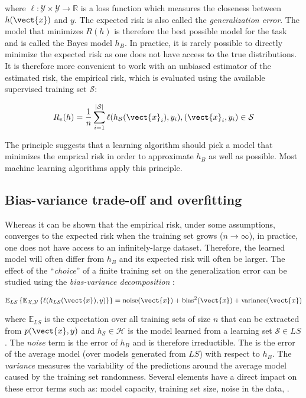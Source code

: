 where $\ell: \mathcal{Y}\times\mathcal{Y} \rightarrow \mathbb{R}$ is a loss function
which measures the closeness between $h(\vect{x})$ and $y$. The expected risk is
also called the \textit{generalization error}. The model that minimizes $R(h)$ is
therefore the best possible model for the task and is called the Bayes model $h_B$.
In practice, it is rarely possible to directly minimize the expected risk as one
does not have access to the true distributions. It is therefore more convenient
to work with an unbiased estimator of the estimated risk, the empirical risk,
which is evaluated using the available supervised training set $\mathcal{S}$:

\begin{equation}
\label{eqn:backml:empiricalrisk}
R_e(h) = \frac{1}{n} \sum_{i=1}^{|\mathcal{S}|} \ell(h_\mathcal{S}(\vect{x}_i), y_i), (\vect{x}_i, y_i) \in \mathcal{S}
\end{equation}

The  principle suggests that a learning algorithm should pick a
model that minimizes the emprical risk in order to approximate $h_B$ as well as
possible. Most machine learning algorithms apply this principle.

\subsection{Bias-variance trade-off and overfitting}
\label{ssec:backml:bvtradeoff}

Whereas it can be shown that the empirical risk, under some assumptions, converges
to the expected risk when the training set grows ($n \rightarrow \infty$), in
practice, one does not have access to an infinitely-large dataset. Therefore, the
learned model will often differ from $h_B$ and its expected risk will often be
larger. The effect of the ``\textit{choice}'' of a finite training set on the
generalization error can be studied using the \textit{bias-variance decomposition}
\parencite{geman1992neural, geurts2009bias, friedman2017elements}:

\begin{equation}
\label{eqn:backml:biasvariancedec}
\mathbb{E}_{LS}\left\{\mathbb{E}_{\mathcal{X},\mathcal{Y}}\left\{ \ell(h_{LS}(\vect{x}), y)\right\}\right\} = \text{noise}(\vect{x}) + \text{bias}^2(\vect{x}) + \text{variance}(\vect{x})
\end{equation}

where $\mathbb{E}_{LS}$ is the expectation over all training sets of size $n$ that
can be extracted from $p(\vect{x},y)$ and $h_{\mathcal{S}} \in \mathcal{H}$ is
the model learned from a learning set $\mathcal{S} \in LS$. The \textit{noise}
term is the error of $h_B$ and is therefore irreductible. The  is the
error of the average model (over models generated from $LS$) with respect to $h_B$.
The \textit{variance} measures the variability of the predictions around the
average model caused by the training set randomness. Several elements have a direct
impact on these error terms such as: model capacity, training set size, noise in
the data, \etc.

